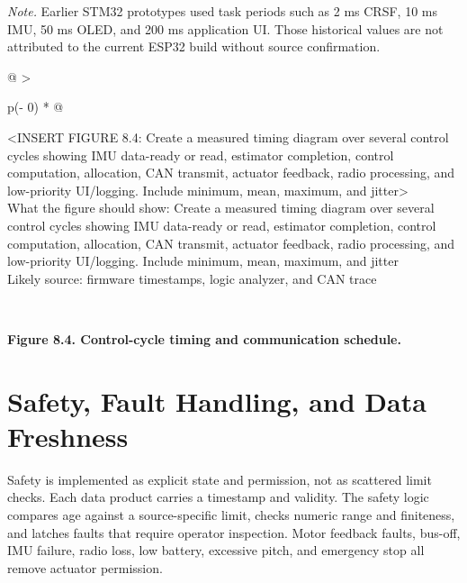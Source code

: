 \emph{Note.} Earlier STM32 prototypes used task periods such as 2 ms
CRSF, 10 ms IMU, 50 ms OLED, and 200 ms application UI. Those historical
values are not attributed to the current ESP32 build without source
confirmation.

\begin{longtable}[]{@{}
  >{\raggedright\arraybackslash}p{(\columnwidth - 0\tabcolsep) * }@{}}
\toprule\noalign{}
\begin{minipage}[b]{\linewidth}\raggedright
\textless INSERT FIGURE 8.4: Create a measured timing diagram over
several control cycles showing IMU data-ready or read, estimator
completion, control computation, allocation, CAN transmit, actuator
feedback, radio processing, and low-priority UI\slash{}logging. Include
minimum, mean, maximum, and jitter\textgreater{}\\
What the figure should show: Create a measured timing diagram over
several control cycles showing IMU data-ready or read, estimator
completion, control computation, allocation, CAN transmit, actuator
feedback, radio processing, and low-priority UI\slash{}logging. Include
minimum, mean, maximum, and jitter\\
Likely source: firmware timestamps, logic analyzer, and CAN trace\strut
\end{minipage} \\
\midrule\noalign{}
\endhead
\bottomrule\noalign{}
\endlastfoot
\end{longtable}

\begin{center}\singlespacing
{}
\textbf{Figure 8.4. Control-cycle timing and communication schedule.}
\end{center}

\section{Safety, Fault Handling, and Data Freshness}\label{safety-fault-handling-and-data-freshness}

Safety is implemented as explicit state and permission, not as scattered
limit checks. Each data product carries a timestamp and validity. The
safety logic compares age against a source-specific limit, checks
numeric range and finiteness, and latches faults that require operator
inspection. Motor feedback faults, bus-off, IMU failure, radio loss, low
battery, excessive pitch, and emergency stop all remove actuator
permission.

